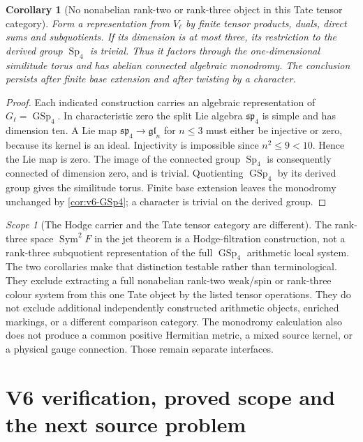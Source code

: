 \documentclass[11pt]{article}
\newtheorem{corollary}[corollary]{Corollary}
\theoremstyle{definition}
\theoremstyle{remark}
\newtheorem{scope}[scope]{Scope}
\begin{document}
\begin{corollary}[No nonabelian rank-two or rank-three object in this Tate tensor category]
\label{cor:v6-small-ranks}
Form a representation from $V_\ell$ by finite tensor products, duals,
direct sums and subquotients. If its dimension is at most three, its
restriction to the derived group $\operatorname{Sp}_4$ is trivial.
Thus it factors through the one-dimensional similitude torus and has
abelian connected algebraic monodromy. The conclusion persists after
finite base extension and after twisting by a character.
\end{corollary}
\begin{proof}
Each indicated construction carries an algebraic representation of
$G_\ell=\operatorname{GSp}_4$. In characteristic zero the split Lie
algebra $\mathfrak{sp}_4$ is simple and has dimension ten. A Lie map
$\mathfrak{sp}_4\to\mathfrak{gl}_n$ for $n\le3$ must either be
injective or zero, because its kernel is an ideal. Injectivity is
impossible since $n^2\le9<10$. Hence the Lie map is zero. The image
of the connected group $\operatorname{Sp}_4$ is consequently connected
of dimension zero, and is trivial. Quotienting
$\operatorname{GSp}_4$ by its derived group gives the similitude
torus. Finite base extension leaves the monodromy unchanged by
\cref{cor:v6-GSp4}; a character is trivial on the derived group.
\end{proof}

\begin{scope}[The Hodge carrier and the Tate tensor category are different]
The rank-three space $\operatorname{Sym}^2F$ in the jet theorem is a
Hodge-filtration construction, not a rank-three subquotient representation
of the full $\operatorname{GSp}_4$ arithmetic local system. The two
corollaries make that distinction testable rather than terminological.
They exclude extracting a full nonabelian rank-two weak/spin or rank-three
colour system from this one Tate object by the listed tensor operations.
They do not exclude additional independently constructed arithmetic
objects, enriched markings, or a different comparison category. The
monodromy calculation also does not produce a common positive Hermitian
metric, a mixed source kernel, or a physical gauge connection. Those
remain separate interfaces.
\end{scope}


\section{V6 verification, proved scope and the next source problem}
\label{sec:v6-status}
\end{document}
